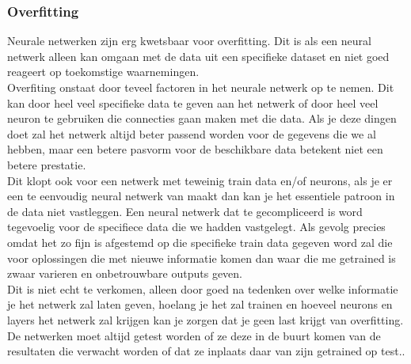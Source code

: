 \subsubsection{Overfitting}
Neurale netwerken zijn erg kwetsbaar voor overfitting. Dit is als een neural netwerk alleen kan omgaan met de data uit een specifieke dataset en niet goed reageert op toekomstige waarnemingen\cite{algoritms}.\\ 
\newline
Overfiting onstaat door teveel factoren in het neurale netwerk op te nemen. Dit kan door heel veel specifieke data te geven aan het netwerk of door heel veel neuron te gebruiken die connecties gaan maken met die data. Als je deze dingen doet zal het netwerk altijd beter passend worden voor de gegevens die we al hebben, maar een betere pasvorm voor de beschikbare data betekent niet een betere prestatie\cite{algoritms}. \\
\newline
Dit klopt ook voor een netwerk met teweinig train data en/of neurons, als je er een te eenvoudig neural netwerk van maakt dan kan je het essentiele patroon in de data niet vastleggen. Een neural netwerk dat te gecompliceerd is word tegevoelig voor de specifiece data die we hadden vastgelegt. Als gevolg precies omdat het zo fijn is afgestemd op die specifieke train data gegeven word zal die voor oplossingen die met nieuwe informatie komen dan waar die me getrained is zwaar varieren en onbetrouwbare outputs geven\cite{algoritms}.\\
\newline
Dit is niet echt te verkomen, alleen door goed na tedenken over welke informatie je het netwerk zal laten geven, hoelang je het zal trainen en hoeveel neurons en layers het netwerk zal krijgen kan je zorgen dat je geen last krijgt van overfitting. De netwerken moet altijd getest worden of ze deze in de buurt komen van de resultaten die verwacht worden of dat ze inplaats daar van zijn getrained op test.\cite{algoritms}.
